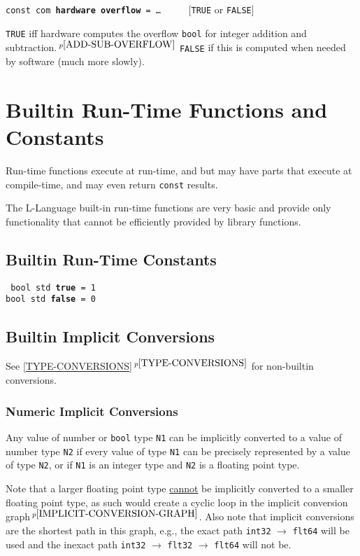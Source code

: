 \documentclass[12pt]{article}
\newcommand{\ttkey}[1]{{\tt \bfseries #1}}
\newcommand{\itemref}[1]{\ref{#1}$\,^{p\pageref{#1}}$}
\newcommand{\pagnote}[1]{$\,^{p\pageref{#1}}$}
\newenvironment{indpar}[1][0.3in]%
	{\begin{list}{}%
		     {\setlength{\itemsep}{0in}%
		      \setlength{\topsep}{0in}%
		      \setlength{\parsep}{1ex}%
		      \setlength{\labelwidth}{#1}%
		      \setlength{\leftmargin}{#1}%
		      \addtolength{\leftmargin}{\labelsep}}%
	 \item}%
	{\end{list}}
\begin{document}
{\tt const com \ttkey{hardware overflow} =
    \ldots{}} ~~~~~[{\tt TRUE} or {\tt FALSE}]%
\label{HARDWARE-OVERFLOW}
\begin{indpar}
{\tt TRUE} iff hardware computes the overflow {\tt bool} for integer
addition and subtraction.\pagnote{ADD-SUB-OVERFLOW}
{\tt FALSE} if this is computed when needed by software
(much more slowly).
\end{indpar}

\section{Builtin Run-Time Functions and Constants}

Run-time functions execute at run-time, and but may have
parts that execute at compile-time, and may even return
{\tt const} results.

The L-Language built-in run-time functions are very basic
and provide only functionality that cannot be efficiently
provided by library functions.

\subsection{Builtin Run-Time Constants}
\label{BUILTIN-RUN-TIME-CONSTANTS}

\begin{indpar} \tt
bool std \ttkey{true} = 1 \\
bool std \ttkey{false} = 0
\end{indpar}


\subsection{Builtin Implicit Conversions}
\label{BUILTIN-IMPLICIT-CONVERSIONS}

See \itemref{TYPE-CONVERSIONS} for non-builtin conversions.


\subsubsection{Numeric Implicit Conversions}
\label{NUMERIC-IMPLICIT-CONVERSIONS}

Any value of number or {\tt bool} type {\tt N1}
can be implicitly converted to a value
of number type {\tt N2} if every value of type {\tt N1} can be
precisely represented by a value of type {\tt N2}, or if {\tt N1} is
an integer type and {\tt N2}
is a floating point type.

Note that a larger floating point type
\underline{cannot} be implicitly converted to a smaller floating point type,
as such would create a cyclic loop in the
implicit conversion graph\pagnote{IMPLICIT-CONVERSION-GRAPH}.
Also note that implicit conversions are the shortest path in this
graph, e.g., the exact path {\tt int32} $\rightarrow$ {\tt flt64}
will be used and the inexact path
{\tt int32} $\rightarrow$ {\tt flt32} $\rightarrow$ {\tt flt64} will not be.
\end{document}
